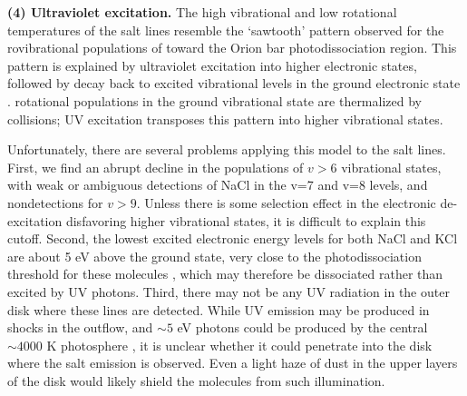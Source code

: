 \documentclass[twocolumn]{aastex62}
\begin{document}
\par{\textbf{(4) Ultraviolet excitation.}}
%
%
The high vibrational and low rotational temperatures of the
salt lines resemble the `sawtooth' pattern observed for the rovibrational
populations of \hh toward the Orion bar photodissociation region.  This
pattern is explained by ultraviolet excitation into higher electronic states,
followed by decay back to excited vibrational levels in the ground electronic
state \citep{Kaplan2017a}.  \hh rotational populations in the ground vibrational
state are thermalized by collisions; UV excitation transposes this pattern into
higher vibrational states.


Unfortunately, there are several problems applying this model to the salt lines.
First, we find an abrupt decline in the populations of $v > 6$ vibrational states,
with weak or ambiguous detections of NaCl in the v=7 and v=8 levels, and
nondetections for $v > 9$.  Unless there is
some selection effect in the electronic de-excitation disfavoring higher vibrational
states, it is difficult to explain this cutoff.  
Second, the lowest excited electronic energy levels for both NaCl and KCl are about
5 eV above the ground state, very close to the photodissociation threshold for these
molecules \citep{Zeiri1983, Silver1986}, which
may therefore be dissociated rather than excited by UV photons.
Third, there may not be any UV radiation in the outer disk where these lines
are detected.  
While UV
emission may be produced in shocks in the outflow, and $\sim5$ eV photons
could be produced by the central $\sim4000$ K photosphere \citep{Testi2010a},
it is unclear whether it could penetrate into the disk where the salt emission
is observed.  Even a light haze of dust in the upper layers of the disk would
likely shield the molecules from such illumination.
\end{document}
